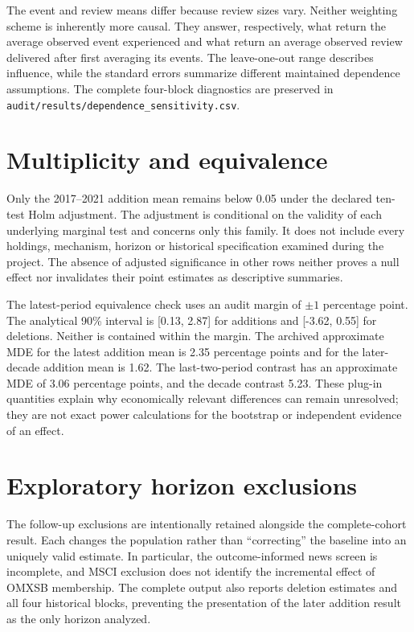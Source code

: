 The event and review means differ because review sizes vary. Neither weighting scheme is inherently more causal. They answer, respectively, what return the average observed event experienced and what return an average observed review delivered after first averaging its events. The leave-one-out range describes influence, while the standard errors summarize different maintained dependence assumptions. The complete four-block diagnostics are preserved in \texttt{audit/results/dependence\_sensitivity.csv}.
\FloatBarrier

\section{Multiplicity and equivalence}
\label{app:multi}


Only the 2017--2021 addition mean remains below 0.05 under the declared ten-test Holm adjustment. The adjustment is conditional on the validity of each underlying marginal test and concerns only this family. It does not include every holdings, mechanism, horizon or historical specification examined during the project. The absence of adjusted significance in other rows neither proves a null effect nor invalidates their point estimates as descriptive summaries.

The latest-period equivalence check uses an audit margin of $\pm1$ percentage point. The analytical 90\% interval is [0.13, 2.87] for additions and [-3.62, 0.55] for deletions. Neither is contained within the margin. The archived approximate MDE for the latest addition mean is 2.35 percentage points and for the later-decade addition mean is 1.62. The last-two-period contrast has an approximate MDE of 3.06 percentage points, and the decade contrast 5.23. These plug-in quantities explain why economically relevant differences can remain unresolved; they are not exact power calculations for the bootstrap or independent evidence of an effect.
\FloatBarrier

\section{Exploratory horizon exclusions}
\label{app:horizon}


The follow-up exclusions are intentionally retained alongside the complete-cohort result. Each changes the population rather than ``correcting'' the baseline into an uniquely valid estimate. In particular, the outcome-informed news screen is incomplete, and MSCI exclusion does not identify the incremental effect of OMXSB membership. The complete output also reports deletion estimates and all four historical blocks, preventing the presentation of the later addition result as the only horizon analyzed.
\FloatBarrier

